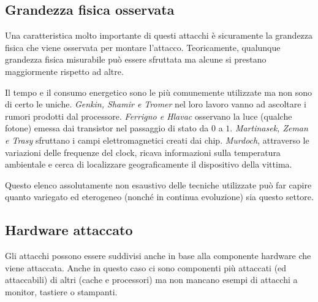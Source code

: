 		\subsection*{Grandezza fisica osservata}		
			Una caratteristica molto importante di questi attacchi è sicuramente la grandezza fisica che viene osservata per montare l'attacco. Teoricamente, qualunque grandezza fisica misurabile può essere sfruttata ma alcune si prestano maggiormente rispetto ad altre. 
			
			Il tempo e il consumo energetico sono le più comunemente utilizzate ma non sono di certo le uniche. \emph{Genkin, Shamir e Tromer} nel loro lavoro \cite{genkin2014rsa} vanno ad ascoltare i rumori prodotti dal processore. \emph{Ferrigno e Hlavac}\cite{ferrigno2008aes} osservano la luce (qualche fotone) emessa dai transistor nel passaggio di stato da $0$ a $1$. \emph{Martinasek, Zeman e Trasy}\cite{martinasek2012simple} sfruttano i campi elettromagnetici creati dai chip. \emph{Murdoch}, attraverso le variazioni delle frequenze del clock, ricava informazioni sulla temperatura ambientale e cerca di localizzare geograficamente il dispositivo della vittima.
			
			Questo elenco assolutamente non esaustivo delle tecniche utilizzate può far capire quanto variegato ed eterogeneo (nonché in continua evoluzione) sia questo settore.
			
		\subsection*{Hardware attaccato}		
			Gli attacchi possono essere suddivisi anche in base alla componente hardware che viene attaccata. Anche in questo caso ci sono componenti più attaccati (ed attaccabili) di altri (cache e processori) ma non mancano esempi di attacchi a monitor\cite{van1985electromagn}, tastiere\cite{asonov2004keyboard} o stampanti\cite{backes2010acoustic}.
			
